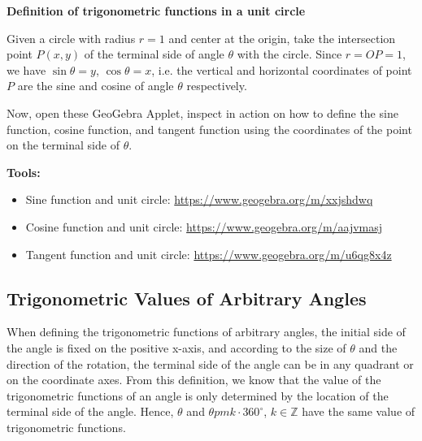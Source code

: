 \documentclass{report}
\begin{document}
\begin{explore}
    
    \noindent \textbf{Definition of trigonometric functions in a unit circle}

    \noindent Given a circle with radius $r=1$ and center at the origin, take the intersection point $P(x, y)$ of the terminal side of angle $\theta$ with the circle. Since $r = OP = 1$, we have $\sin\theta = y$, $\cos\theta = x$, i.e. the vertical and horizontal coordinates of point $P$ are the sine and cosine of angle $\theta$ respectively.

    \noindent Now, open these GeoGebra Applet, inspect in action on how to define the sine function, cosine function, and tangent function using the coordinates of the point on the terminal side of $\theta$.

    \noindent \textbf{Tools:}
    \vspace{-1em}
    \begin{itemize}[leftmargin=*]
        \item Sine function and unit circle: \url{https://www.geogebra.org/m/xxjshdwq}
        \item Cosine function and unit circle: \url{https://www.geogebra.org/m/aajvmasj}
        \item Tangent function and unit circle: \url{https://www.geogebra.org/m/u6qg8x4z}
    \end{itemize}
\end{explore}

\vspace{-0.5em}
\subsection*{Trigonometric Values of Arbitrary Angles}

When defining the trigonometric functions of arbitrary angles, the initial side of the angle is fixed on the positive x-axis, and according to the size of $\theta$ and the direction of the rotation, the terminal side of the angle can be in any quadrant or on the coordinate axes. From this definition, we know that the value of the trigonometric functions of an angle is only determined by the location of the terminal side of the angle. Hence, $\theta$ and $\theta pm k \cdot 360^\circ$, $k \in \mathbb{Z}$ have the same value of trigonometric functions.
\end{document}
